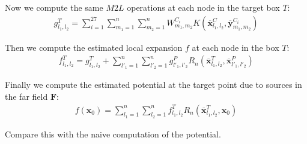 Now we compute the same $M2L$ operations at each node in the target box $T$:
\begin{align}
g^T_{l_1,l_2} = \sum_{i=1}^{27}\sum_{m_1=1}^n\sum_{m_2=1}^n W_{m_1,m_2}^{C_i}K(\mathbf{\overline{x}}^C_{l_1,l_2},\mathbf{\overline{y}}^{C_i}_{m_1,m_2})
\end{align}

Then we compute the estimated local expansion $f$ at each node in the box $T$:
\begin{align}
f^T_{l_1,l_2} = g^T_{l_1,l_2} + \sum_{l'_1=1}^n\sum_{l'_2=1}^n g^P_{l'_1,l'_2}R_n(\mathbf{\overline{x}}^T_{l_1,l_2},\mathbf{\overline{x}}^P_{l'_1,l'_2})
\end{align}

Finally we compute the estimated potential at the target point due to sources in the far field $\mathbf{F}$:
\begin{align}
f(\mathbf{x}_0) = \sum_{l_1=1}^n\sum_{l_2=1}^n f^T_{l_1,l_2} R_n(\mathbf{\overline{x}}^T_{l_1,l_2},\mathbf{x}_0)
\end{align}

Compare this with the naive computation of the potential.

